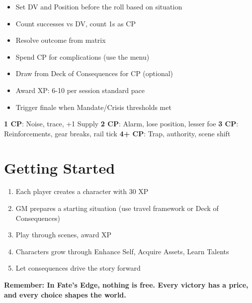 \documentclass[11pt]{article}
\begin{document}
\begin{itemize}
    \item Set DV and Position before the roll based on situation
    \item Count successes vs DV, count 1s as CP
    \item Resolve outcome from matrix
    \item Spend CP for complications (use the menu)
    \item Draw from Deck of Consequences for CP (optional)
    \item Award XP: 6-10 per session standard pace
    \item Trigger finale when Mandate/Crisis thresholds met
\end{itemize}

\begin{fatebox}
\textbf{1 CP}: Noise, trace, +1 Supply
\textbf{2 CP}: Alarm, lose position, lesser foe
\textbf{3 CP}: Reinforcements, gear breaks, rail tick  
\textbf{4+ CP}: Trap, authority, scene shift
\end{fatebox}

\section{Getting Started}

\begin{enumerate}
    \item Each player creates a character with 30 XP
    \item GM prepares a starting situation (use travel framework or Deck of Consequences)
    \item Play through scenes, award XP
    \item Characters grow through Enhance Self, Acquire Assets, Learn Talents
    \item Let consequences drive the story forward
\end{enumerate}

\begin{center}
\textbf{Remember: In Fate's Edge, nothing is free. Every victory has a price, and every choice shapes the world.}
\end{center}
\end{document}
